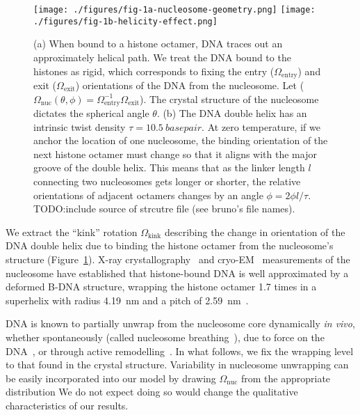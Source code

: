 \documentclass[%
 reprint,
superscriptaddress,
showpacs,preprintnumbers,
 amsmath,amssymb,
 aps,
 prl,
]{revtex4-1}
\begin{document}
\begin{figure}[t]
    \centering
    \texttt{[image: ./figures/fig-1a-nucleosome-geometry.png]}
    \texttt{[image: ./figures/fig-1b-helicity-effect.png]}
    \caption{(a) When bound to a histone octamer, DNA traces out an
    approximately helical path. We treat the DNA bound to the histones as rigid,
    which corresponds to fixing the entry ($\Omega_\text{entry}$) and exit
    ($\Omega_\text{exit}$) orientations of the DNA from the nucleosome. Let
    ($\Omega_\text{nuc}(\theta, \phi)  =
    \Omega_\text{entry}^{-1}\Omega_\text{exit}$). The crystal structure of the
    nucleosome dictates the spherical angle $\theta$.
    (b) The DNA double helix has an intrinsic twist density
    $\tau=\SI{10.5}{basepair}$. At zero
    temperature, if we anchor the location of one nucleosome, the binding
    orientation of the next histone octamer must change so that it aligns with
    the major groove of the double helix. This means that as the linker length
    $l$ connecting two nucleosomes gets longer or shorter, the relative
    orientations of adjacent octamers changes by an angle $\phi = 2\phi l/\tau$.
    TODO:\@ include source of strcutre file (see bruno's file names).}\label{fig:nuc-geo}
\end{figure}

We extract the ``kink'' rotation $\Omega_\text{kink}$ describing the change in
    orientation of the DNA double helix due to binding the histone octamer from
    the nucleosome's structure (Figure~\ref{fig:nuc-geo}).
X-ray crystallography~\cite{white2001,richmond2003,cutter2015a} and
    cryo-EM~\cite{bednar2017,bilokapic2018,eltsov2018,wakamori2015,zhou2015}
    measurements of the nucleosome have established that histone-bound DNA is
    well approximated by a deformed B-DNA structure, wrapping the histone
    octamer 1.7 times in a superhelix with radius \SI{4.19}{\nano\metre} and a
    pitch of \SI{2.59}{\nano\metre}~\cite{richmond2003}.

DNA is known to partially unwrap from the nucleosome core dynamically \textit{in
    vivo}, whether spontaneously (called nucleosome breathing~\cite{TODO}), due to
    force on the DNA~\cite{TODO}, or through active
    remodelling~\cite{dion2007,kulaeva2007,senavirathne2017}.
In what follows, we fix the wrapping level to that found in the crystal
    structure.
Variability in nucleosome unwrapping can be easily incorporated into our model
    by drawing $\Omega_\text{nuc}$ from the appropriate distribution
We do not expect doing so would change the qualitative characteristics of our
    results.
\end{document}
